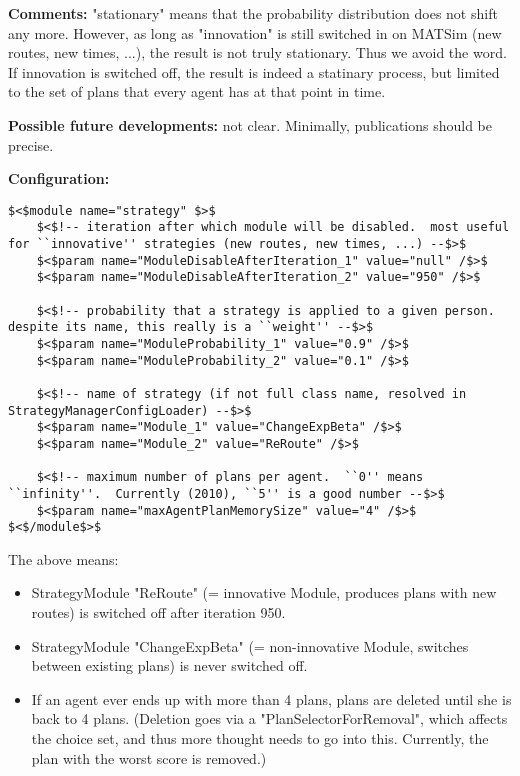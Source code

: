 \documentclass[a4paper,11pt]{report}
\begin{document}
\textbf{Comments:} "stationary" means that the probability   distribution does not shift any  more. However, as long as  "innovation"  is still switched in on MATSim  (new routes, new times,  ...), the  result is not truly stationary. Thus  we avoid the  word. If innovation  is switched off, the result is indeed a   statinary process, but limited  to the set of plans that every agent has   at that point in time.

\textbf{Possible future developments:} not clear. Minimally, publications should be precise.

\textbf{Configuration:}
\begin{verbatim}
$<$module name="strategy" $>$
	$<$!-- iteration after which module will be disabled.  most useful for ``innovative'' strategies (new routes, new times, ...) --$>$
	$<$param name="ModuleDisableAfterIteration_1" value="null" /$>$
	$<$param name="ModuleDisableAfterIteration_2" value="950" /$>$

	$<$!-- probability that a strategy is applied to a given person.  despite its name, this really is a ``weight'' --$>$
	$<$param name="ModuleProbability_1" value="0.9" /$>$
	$<$param name="ModuleProbability_2" value="0.1" /$>$

	$<$!-- name of strategy (if not full class name, resolved in StrategyManagerConfigLoader) --$>$
	$<$param name="Module_1" value="ChangeExpBeta" /$>$
	$<$param name="Module_2" value="ReRoute" /$>$

	$<$!-- maximum number of plans per agent.  ``0'' means ``infinity''.  Currently (2010), ``5'' is a good number --$>$
	$<$param name="maxAgentPlanMemorySize" value="4" /$>$
$<$/module$>$
\end{verbatim}

The above means:
\begin{itemize}
	\item StrategyModule "ReRoute" (= innovative Module, produces plans with new routes) is switched off after iteration 950.
	\item StrategyModule "ChangeExpBeta" (= non-innovative Module, switches between existing plans) is never switched off.
	\item If an agent ever ends up with more than 4 plans, plans are deleted  until she is back to 4 plans. (Deletion goes via a  "PlanSelectorForRemoval", which affects the choice set, and thus more  thought needs to go into this. Currently, the plan with the worst  score is removed.)
\end{itemize}
\end{document}
